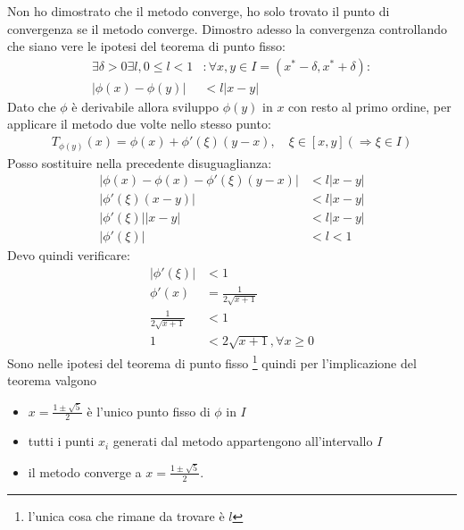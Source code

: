 Non ho dimostrato che il metodo converge, ho solo trovato il punto di
convergenza se il metodo converge. Dimostro adesso la convergenza controllando
che siano vere le ipotesi del teorema di punto fisso:
\begin{displaymath}
 \begin{split}
 	\exists \delta > 0 \exists l, 0 \leq l < 1 &: \forall x, y \in I = (x^{*} -
 	\delta, x^{*} +	\delta): \\
 	|\phi(x) - \phi(y)| &< l|x - y|
 \end{split}
\end{displaymath}
Dato che $\phi$ \`e derivabile allora sviluppo $\phi(y)$ in $x$ con resto al
primo ordine, per applicare il metodo due volte nello stesso punto:
\begin{displaymath}
 \begin{split}
 	T_{\phi(y)}(x) = \phi(x) + \phi'(\xi)(y - x), \quad \xi \in [x, y]
 	(\Rightarrow \xi \in I)
 \end{split}
\end{displaymath}
Posso sostituire nella precedente disuguaglianza:
\begin{displaymath}
 \begin{split}
 	|\phi(x) - \phi(x) - \phi'(\xi)(y - x)| &< l|x - y| \\
 	|\phi'(\xi)(x - y)| &< l|x - y| \\
 	|\phi'(\xi)||x - y| &< l|x - y| \\
 	|\phi'(\xi)| &< l < 1
 \end{split}
\end{displaymath}
Devo quindi verificare:
\begin{displaymath}
 \begin{split}
 	|\phi'(\xi)| &< 1 \\
 	\phi'(x) &= \frac{1}{2\sqrt{x + 1}} \\
 	\frac{1}{2\sqrt{x + 1}} &< 1 \\
 	1 &< 2\sqrt{x + 1}, \forall x \geq 0
 \end{split}
\end{displaymath}
Sono nelle ipotesi del teorema di punto fisso \footnote{l'unica cosa che rimane
da trovare \`e $l$} quindi per l'implicazione del teorema valgono
\begin{itemize}
  \item $x = \frac{1 \pm \sqrt{5}}{2}$ \`e l'unico punto fisso di $\phi$ in $I$
  \item tutti i punti $x_{i}$ generati dal metodo appartengono all'intervallo
  $I$
  \item il metodo converge a $x = \frac{1 \pm \sqrt{5}}{2}$.
\end{itemize}
